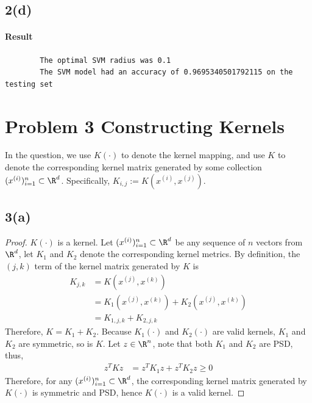 \documentclass[11pt]{article}
\newcommand{\upi}[0]{^{(i)}}
\begin{document}
	\newpage
	\subsection{2(d)}
	\paragraph{Result}
	\begin{verbatim}
		The optimal SVM radius was 0.1
		The SVM model had an accuracy of 0.9695340501792115 on the testing set
	\end{verbatim}
	
	\newpage
	\section{Problem 3 Constructing Kernels}
	\begin{notation}
		In the question, we use $K(\cdot)$ to denote the kernel mapping, and use $K$ to denote the corresponding kernel matrix generated by some collection $(x\upi)_{i=1}^n \subset \R^d$. Specifically, $K_{i, j} := K(x\upi, x^{(j)})$.
	\end{notation}
	\subsection{3(a)}
	\begin{proof}
		$K(\cdot)$ is a kernel. Let $(x\upi)_{i=1}^n \subset \R^d$ be any sequence of $n$ vectors from $\R^d$, let $K_1$ and $K_2$ denote the corresponding kernel metrics. By definition, the $(j, k)$ term of the kernel matrix generated by $K$ is 
		\begin{align}
			K_{j,k} &= K(x^{(j)}, x^{(k)}) \\
			&= K_1(x^{(j)}, x^{(k)}) + K_2(x^{(j)}, x^{(k)}) \\
			&= K_{1, j, k} + K_{2, j, k}
		\end{align}
		Therefore, $K = K_1 + K_2$. Because $K_1(\cdot)$ and $K_2(\cdot)$ are valid kernels, $K_1$ and $K_2$ are symmetric, so is $K$. Let $z \in \R^n$, note that both $K_1$ and $K_2$ are PSD, thus,
		\begin{align}
			z^T K z &= z^T K_1 z + z^T K_2 z \geq 0
		\end{align}
		Therefore, for any $(x\upi)_{i=1}^n \subset \R^d$, the corresponding kernel matrix generated by $K(\cdot)$ is symmetric and PSD, hence $K(\cdot)$ is a valid kernel.
	\end{proof}
	
	\newpage
\end{document}
